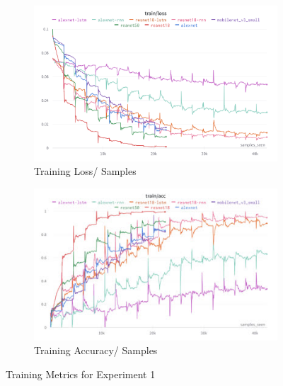 \documentclass[a4paper]{article}
\begin{document}
  \begin{figure}[ht]
    \centering
    \begin{subfigure}[b]{0.49\linewidth}
      \centering
      \includegraphics[width=\linewidth]{figures/experiment1-train-loss.png}
      \caption{Training Loss/ Samples}
      \label{fig:experiment1-train-acc}
    \end{subfigure}
    \hfill
    \begin{subfigure}[b]{0.49\linewidth}
      \centering
      \includegraphics[width=\linewidth]{figures/experiment1-train-acc.jpg}
      \caption{Training Accuracy/ Samples}
      \label{fig:experiment1-train-loss}
    \end{subfigure}
    \caption{Training Metrics for Experiment 1}
    \label{fig:experiment-1-training}
  \end{figure}
\end{document}
